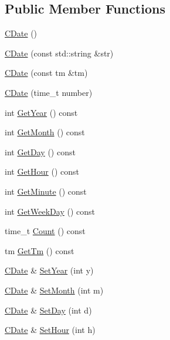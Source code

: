 \subsection*{Public Member Functions}
\begin{DoxyCompactItemize}
\item 
\mbox{\hyperlink{class_c_date_abaab9d809338418c9a749ce479fcea61}{C\+Date}} ()
\item 
\mbox{\hyperlink{class_c_date_a208b6e697c2a65f42f398d2795d11115}{C\+Date}} (const std\+::string \&str)
\item 
\mbox{\hyperlink{class_c_date_a6c2d5510af2358d586b69b28adba03bf}{C\+Date}} (const tm \&tm)
\item 
\mbox{\hyperlink{class_c_date_a7e0bd9e23e35749322dee61812b2a604}{C\+Date}} (time\+\_\+t number)
\item 
int \mbox{\hyperlink{class_c_date_a27e6152eadf6eeb8aded10c7bbc30660}{Get\+Year}} () const
\item 
int \mbox{\hyperlink{class_c_date_ab35843343ac697ba7ff56c490a3a63aa}{Get\+Month}} () const
\item 
int \mbox{\hyperlink{class_c_date_a0ca574460424a4d3bd626de64077ea04}{Get\+Day}} () const
\item 
int \mbox{\hyperlink{class_c_date_a87aa91727803b813e167480856778f9a}{Get\+Hour}} () const
\item 
int \mbox{\hyperlink{class_c_date_a50240341813279851647f7317b177295}{Get\+Minute}} () const
\item 
int \mbox{\hyperlink{class_c_date_abef71ae78644a73ae1277680c93c0442}{Get\+Week\+Day}} () const
\item 
time\+\_\+t \mbox{\hyperlink{class_c_date_aa8f18dfb62e341afba7e7b55d8b63b68}{Count}} () const
\item 
tm \mbox{\hyperlink{class_c_date_aefc467c5b186c0d0c8499e32295eced2}{Get\+Tm}} () const
\item 
\mbox{\hyperlink{class_c_date}{C\+Date}} \& \mbox{\hyperlink{class_c_date_ae999d5eedbd66965ef1e69597bb089ff}{Set\+Year}} (int y)
\item 
\mbox{\hyperlink{class_c_date}{C\+Date}} \& \mbox{\hyperlink{class_c_date_adea44055d51cfb99ebdc8564c472f7a8}{Set\+Month}} (int m)
\item 
\mbox{\hyperlink{class_c_date}{C\+Date}} \& \mbox{\hyperlink{class_c_date_a35209c0b03fc6841fd08c8db4fee68a4}{Set\+Day}} (int d)
\item 
\mbox{\hyperlink{class_c_date}{C\+Date}} \& \mbox{\hyperlink{class_c_date_aa77cbbbcb5bad2663adadfd351d14f87}{Set\+Hour}} (int h)

\end{DoxyCompactItemize}
